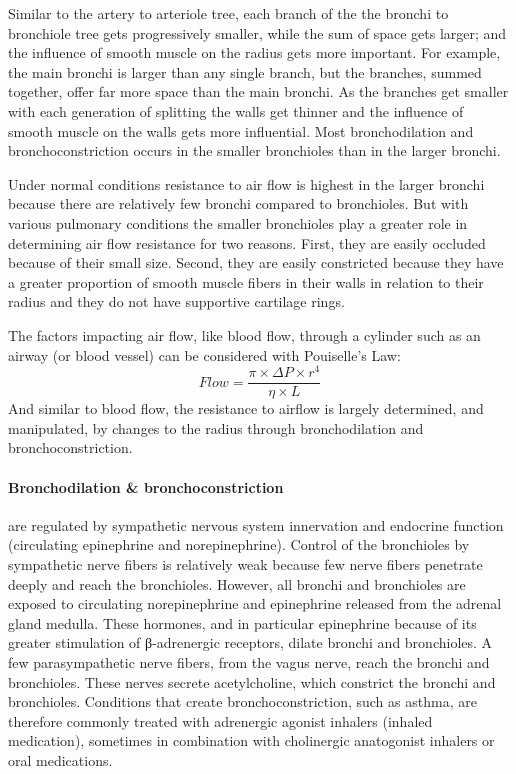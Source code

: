Similar to the artery to arteriole tree, each branch of the the bronchi to bronchiole tree gets progressively smaller, while the sum of space gets larger; and the influence of smooth muscle on the radius gets more important. For example, the main bronchi is larger than any single branch, but the branches, summed together, offer far more space than the main bronchi. As the branches get smaller with each generation of splitting the walls get thinner and the influence of smooth muscle on the walls gets more influential. Most bronchodilation and bronchoconstriction occurs in the smaller bronchioles than in the larger bronchi.

Under normal conditions resistance to air flow is highest in the larger bronchi because there are relatively few bronchi compared to bronchioles. But with various pulmonary conditions the smaller bronchioles play a greater role in determining air flow resistance for two reasons. First, they are easily occluded because of their small size. Second, they are easily constricted because they have a greater proportion of smooth muscle fibers in their walls in relation to their radius and they do not have supportive cartilage rings.

The factors impacting air flow, like blood flow, through a cylinder such as an airway (or blood vessel) can be considered with Pouiselle's Law:
\vspace{3mm}
\begin{equation}
    Flow = \frac{\pi \times \Delta P \times r^4}{\eta \times L}
\end{equation}
\vspace{3mm}
And similar to blood flow, the resistance to airflow is largely determined, and manipulated, by changes to the radius through bronchodilation and bronchoconstriction.


\paragraph{Bronchodilation \& bronchoconstriction} are regulated by sympathetic nervous system innervation and endocrine function (circulating epinephrine and norepinephrine). Control of the bronchioles by sympathetic nerve fibers is relatively weak because few nerve fibers penetrate deeply and reach the bronchioles. However, all bronchi and bronchioles are exposed to circulating norepinephrine and epinephrine released from the adrenal gland medulla. These hormones, and in particular epinephrine because of its greater stimulation of β-adrenergic receptors, dilate bronchi and bronchioles. A few parasympathetic nerve fibers, from the vagus nerve, reach the bronchi and bronchioles. These nerves secrete acetylcholine, which constrict the bronchi and bronchioles. 
Conditions that create bronchoconstriction, such as asthma, are therefore commonly treated with adrenergic agonist inhalers (inhaled medication), sometimes in combination with cholinergic anatogonist inhalers or oral medications.  

